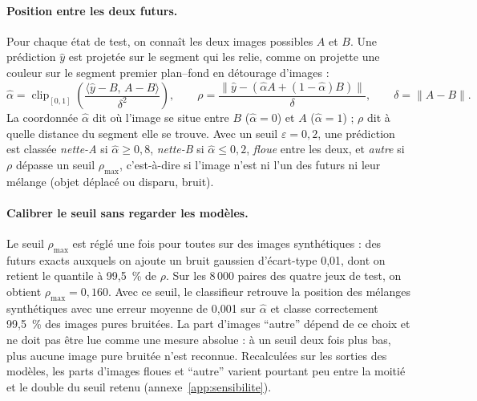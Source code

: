 \documentclass[a4paper, 11pt]{article}
\newcommand{\ahat}{\hat\alpha}
\begin{document}
\paragraph{Position entre les deux futurs.} Pour chaque état de test, on connaît les deux images possibles $A$ et $B$.
Une prédiction $\hat y$ est projetée sur le segment qui les relie, comme on projette une couleur sur le segment
premier plan–fond en détourage d'images \parencite{wang2007matting} :
\begin{equation}
  \ahat = \operatorname{clip}_{[0,1]}\!\left(\frac{\langle \hat y - B,\, A - B\rangle}{\delta^2}\right),
  \qquad
  \rho = \frac{\lVert \hat y - (\ahat A + (1-\ahat) B)\rVert}{\delta},
  \qquad \delta = \lVert A - B\rVert .
\end{equation}
La coordonnée $\ahat$ dit où l'image se situe entre $B$ ($\ahat = 0$) et $A$ ($\ahat = 1$) ; $\rho$ dit à quelle distance du
segment elle se trouve. Avec un seuil $\varepsilon = 0{,}2$, une prédiction est classée \emph{nette-A} si
$\ahat \ge 0{,}8$, \emph{nette-B} si $\ahat \le 0{,}2$, \emph{floue} entre les deux, et \emph{autre} si $\rho$ dépasse un
seuil $\rho_{\max}$, c'est-à-dire si l'image n'est ni l'un des futurs ni leur mélange (objet déplacé ou disparu, bruit).

\paragraph{Calibrer le seuil sans regarder les modèles.} Le seuil $\rho_{\max}$ est réglé une fois pour toutes sur des
images synthétiques : des futurs exacts auxquels on ajoute un bruit gaussien d'écart-type 0,01, dont on retient le quantile
à 99,5~\% de $\rho$. Sur les 8\,000 paires des quatre jeux de test, on obtient $\rho_{\max} = 0{,}160$. Avec ce seuil, le
classifieur retrouve la position des mélanges synthétiques avec une erreur moyenne de 0,001 sur $\ahat$ et classe
correctement 99,5~\% des images pures bruitées. La part d'images \enquote{autre} dépend de ce choix et ne doit pas être lue
comme une mesure absolue : à un seuil deux fois plus bas, plus aucune image pure bruitée n'est reconnue. Recalculées sur
les sorties des modèles, les parts d'images floues et \enquote{autre} varient pourtant peu entre la moitié et le double du seuil
retenu (annexe~\ref{app:sensibilite}).
\end{document}
